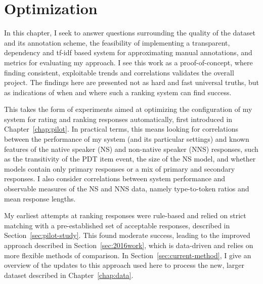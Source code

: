 \chapter{Optimization}
\label{chap:optimization}

In this chapter, I seek to answer questions surrounding the quality of the dataset and its annotation scheme, the feasibility of implementing a transparent, dependency and tf-idf based system for approximating manual annotations, and metrics for evaluating my approach. I see this work as a proof-of-concept, where finding consistent, exploitable trends and correlations validates the overall project. The findings here are presented not as hard and fast universal truths, but as indications of when and where such a ranking system can find success.

This takes the form of experiments aimed at optimizing the configuration of my system for rating and ranking responses automatically, first introduced in Chapter~\ref{chap:pilot}. In practical terms, this means looking for correlations between the performance of my system (and its particular settings) and known features of the native speaker (NS) and non-native speaker (NNS) responses, such as the transitivity of the PDT item event, the size of the NS model, and whether models contain only primary responses or a mix of primary and secondary responses. I also consider correlations between system performance and observable measures of the NS and NNS data, namely type-to-token ratios and mean response lengths.

My earliest attempts at ranking responses were rule-based and relied on strict matching with a pre-established set of acceptable responses, described in Section~\ref{sec:pilot-study}. This found moderate success, leading to the improved approach described in Section~\ref{sec:2016work}, which is data-driven and relies on more flexible methods of comparison.
In Section~\ref{sec:current-method}, I give an overview of the updates to this approach used here to process the new, larger dataset described in Chapter~\ref{chap:data}.

